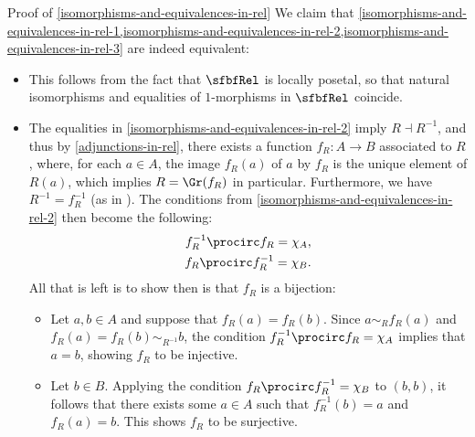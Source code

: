 \begin{Proof}{Proof of \cref{isomorphisms-and-equivalences-in-rel}}%
    We claim that \cref{isomorphisms-and-equivalences-in-rel-1,isomorphisms-and-equivalences-in-rel-2,isomorphisms-and-equivalences-in-rel-3} are indeed equivalent:
    \begin{itemize}%
        \item{}This follows from the fact that $\sfbfRel$ is locally posetal, so that natural isomorphisms and equalities of $1$-morphisms in $\sfbfRel$ coincide.
        \item{}The equalities in \cref{isomorphisms-and-equivalences-in-rel-2} imply $R\dashv R^{-1}$, and thus by \cref{adjunctions-in-rel}, there exists a function $f_{R}\colon A\to B$ associated to $R$, where, for each $a\in A$, the image $f_{R}(a)$ of $a$ by $f_{R}$ is the unique element of $R(a)$, which implies $R=\Gr(f_{R})$ in particular. Furthermore, we have $R^{-1}=f^{-1}_{R}$ (as in ). The conditions from \cref{isomorphisms-and-equivalences-in-rel-2} then become the following:
            \begin{align*}
                f^{-1}_{R}\procirc f_{R} = \chi_{A},\\
                f_{R}\procirc f^{-1}_{R} = \chi_{B}.
            \end{align*}
            All that is left is to show then is that $f_{R}$ is a bijection:
            \begin{itemize}%
                \item{}Let $a,b\in A$ and suppose that $f_{R}(a)=f_{R}(b)$. Since $a\sim_{R}f_{R}(a)$ and $f_{R}(a)=f_{R}(b)\sim_{R^{-1}}b$, the condition $f^{-1}_{R}\procirc f_{R}=\chi_{A}$ implies that $a=b$, showing $f_{R}$ to be injective.
                \item{}Let $b\in B$. Applying the condition $f_{R}\procirc f^{-1}_{R}=\chi_{B}$ to $(b,b)$, it follows that there exists some $a\in A$ such that $f^{-1}_{R}(b)=a$ and $f_{R}(a)=b$. This shows $f_{R}$ to be surjective.
            \end{itemize}%

\end{itemize}
\end{Proof}

